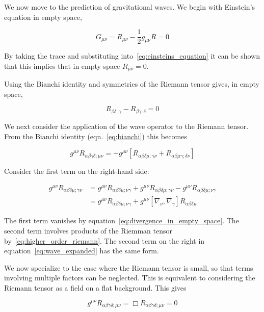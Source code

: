 We now move to the prediction of gravitational waves.  We begin with
Einstein's equation in empty space,

\begin{equation*}
G_{\mu\nu} = R_{\mu\nu} - \frac{1}{2} g_{\mu\nu} R = 0
\end{equation*}

By taking the trace and substituting into~\ref{eq:einsteins_equation}
it can be shown that this implies that in empty space $R_{\mu\nu} =
0$.

Using the Bianchi identity and symmetries of the Riemann tensor gives,
in empty space,

\begin{equation}
\label{eq:divergence_in_empty_space}
R_{\beta\delta;\gamma}  -R_{\beta\gamma;\delta} = 0
\end{equation}

We next consider the application of the wave operator to the Riemann
tensor.  From the Bianchi identity (eqn.~\ref{eq:bianchi}) this becomes

\begin{equation*}
\label{eq:wave_expanded}
g^{\mu\nu} R_{\alpha\beta\gamma\delta;\mu\nu}
= - g^{\mu\nu}
\left[R_{\alpha\beta\delta\mu;\gamma\nu}
+ R_{\alpha\beta\mu\gamma;\delta\nu} \right]
\end{equation*}

Consider the first term on the right-hand side:

\begin{align*}
g^{\mu\nu} R_{\alpha\beta\delta\mu;\gamma\nu}
&= g^{\mu\nu} R_{\alpha\beta\delta\mu;\nu\gamma}
+ g^{\mu\nu} R_{\alpha\beta\delta\mu;\gamma\nu}
- g^{\mu\nu} R_{\alpha\beta\delta\mu;\nu\gamma} \\
&= g^{\mu\nu} R_{\alpha\beta\delta\mu;\nu\gamma}
+ g^{\mu\nu} 
\left[\nabla_\nu,\nabla_\gamma\right] R_{\alpha\beta\delta\mu}
\end{align*}

The first term vanishes by
equation~\ref{eq:divergence_in_empty_space}.  The second term involves
products of the Riemman tensor by~\ref{eq:higher_order_riemann}.  The
second term on the right in equation~\ref{eq:wave_expanded} has the
same form.

We now specialize to the case where the Riemann tensor is small, so
that terms involving multiple factors can be neglected.  This is
equivalent to considering the Riemann tensor as a field on a flat
background.  This gives

\begin{equation}
\label{eq:riemann_wave}
g^{\mu\nu}
R_{\alpha\beta\gamma\delta;\mu\nu}
=
\Box R_{\alpha\beta\gamma\delta;\mu\nu}
= 0
\end{equation}

